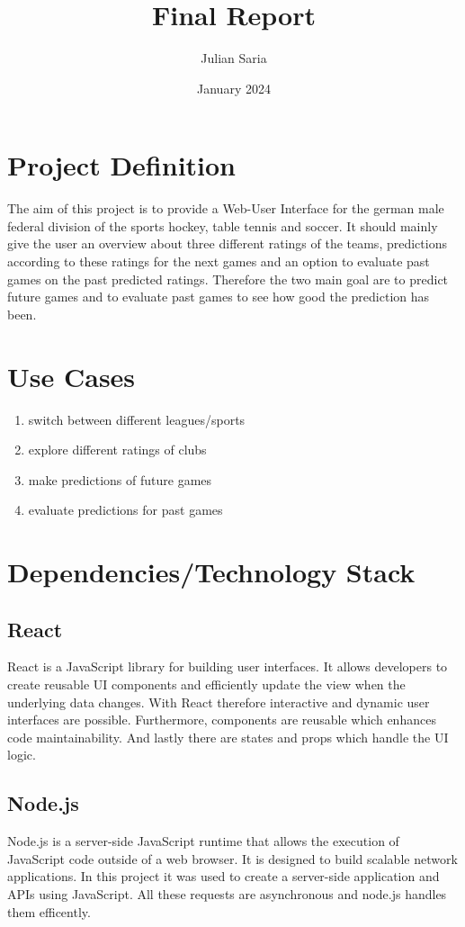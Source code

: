 \documentclass{article}
\title{Final Report}
\author{Julian Saria }
\date{January 2024}
\begin{document}
\maketitle

\section{Project Definition }

The aim of this project is to provide a Web-User Interface for the german male federal division of the sports hockey, table tennis and soccer. It should mainly give the user an overview about three different ratings of the teams, predictions according to these ratings for the next games and an option to evaluate past games on the past predicted ratings. Therefore the two main goal are to predict future games and to evaluate past games to see how good the prediction has been.

\section{Use Cases}
\begin{enumerate}
    \item switch between different leagues/sports
    \item explore different ratings of clubs
    \item make predictions of future games
    \item evaluate predictions for past games
\end{enumerate}


\section{Dependencies/Technology Stack}
\subsection{React}
React is a JavaScript library for building user interfaces. It allows developers to create reusable UI components and efficiently update the view when the underlying data changes. With React therefore interactive and dynamic user interfaces are possible. Furthermore, components are reusable which enhances code maintainability. And lastly there are states and props which handle the UI logic.

\subsection{Node.js}
Node.js is a server-side JavaScript runtime that allows the execution of JavaScript code outside of a web browser. It is designed to build scalable network applications. In this project it was used to create a server-side application and APIs using JavaScript. All these requests are asynchronous and node.js handles them efficently.
\end{document}
